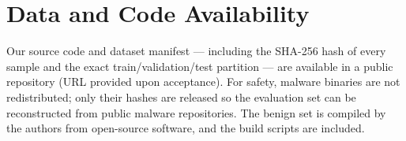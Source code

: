 \documentclass{llncs}
\begin{document}
\section*{Data and Code Availability}
Our source code and dataset manifest --- including the SHA-256 hash of every sample and the exact
train/validation/test partition --- are available in a public repository (URL provided upon acceptance). For safety, malware binaries
are not redistributed; only their hashes are released so the evaluation set can be reconstructed from
public malware repositories. The benign set is compiled by the authors from open-source software, and
the build scripts are included.




\end{document}
